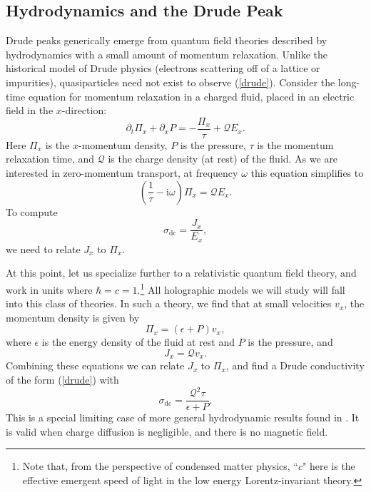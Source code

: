\documentclass[10pt, oneside]{book}
\begin{document}
\begin{doublespace}
\section{Hydrodynamics and the Drude Peak} \label{sec2}
Drude peaks generically emerge from quantum field theories described by hydrodynamics with a small amount of momentum relaxation.    Unlike the historical model of Drude physics (electrons scattering off of a lattice or impurities), quasiparticles need not exist to observe (\ref{drude}).  Consider the long-time equation for momentum relaxation in a charged fluid, placed in an electric field in the $x$-direction: \begin{equation}
\partial_t \Pi_x + \partial_x P = -\frac{\Pi_x}{\tau} + \mathcal{Q} E_x. 
\end{equation}Here $\Pi_x$ is the $x$-momentum density, $P$ is the pressure, $\tau$ is the momentum relaxation time, and $\mathcal{Q}$ is the charge density (at rest) of the fluid.    As we are interested in zero-momentum transport, at frequency $\omega$ this equation simplifies to \begin{equation}
\left(\frac{1}{\tau} -\mathrm{i}\omega\right)\Pi_x = \mathcal{Q}E_x.
\end{equation}To compute \begin{equation}
\sigma_{\mathrm{dc}} = \frac{J_x}{E_x},
\end{equation}we need to relate $J_x$ to $\Pi_x$.

At this point, let us specialize further to a relativistic quantum field theory, and work in units where $\hbar=c=1$.\footnote{Note that, from the perspective of condensed matter physics, ``$c$" here is the effective emergent speed of light in the low energy Lorentz-invariant theory.}  All holographic models we will study will fall into this class of theories.   In such a theory, we find that at small velocities $v_x$, the momentum density is given by \begin{equation}
\Pi_x = (\epsilon+P)v_x,  \label{pix}
\end{equation}where $\epsilon$ is the energy density of the fluid at rest and $P$ is the pressure, and \begin{equation}
J_x = \mathcal{Q}v_x. \label{jx}
\end{equation}
Combining these equations we can relate $J_x$ to $\Pi_x$, and find a Drude conductivity of the form (\ref{drude}) with \begin{equation}
\sigma_{\mathrm{dc}} = \frac{\mathcal{Q}^2\tau}{\epsilon+P}.  \label{sigmadc}
\end{equation}
This is a special limiting case of more general hydrodynamic results found in \cite{hkms}.  It is valid when charge diffusion is negligible, and there is no magnetic field.     


\end{doublespace}
\end{document}
